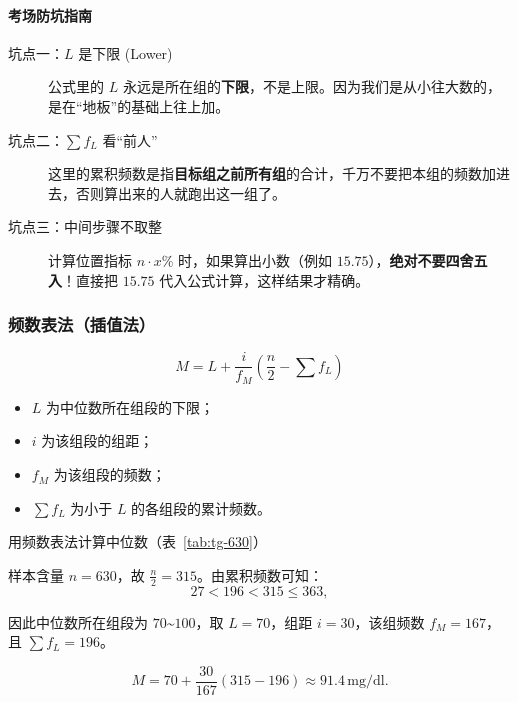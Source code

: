 \documentclass[lang=cn,10pt]{elegantbook}
\begin{document}
\paragraph{考场防坑指南}

\begin{description}
    \item[坑点一：$L$ 是下限 (Lower)]
    公式里的 $L$ 永远是所在组的\textbf{下限}，不是上限。因为我们是从小往大数的，是在“地板”的基础上往上加。

    \item[坑点二：$\sum f_L$ 看“前人”]
    这里的累积频数是指\textbf{目标组之前所有组}的合计，千万不要把本组的频数加进去，否则算出来的人就跑出这一组了。

    \item[坑点三：中间步骤不取整]
    计算位置指标 $n \cdot x\%$ 时，如果算出小数（例如 $15.75$），\textbf{绝对不要四舍五入}！直接把 $15.75$ 代入公式计算，这样结果才精确。
\end{description}

\subsubsection{频数表法（插值法）}
\begin{equation}
M=L+\frac{i}{f_M}\left(\frac{n}{2}-\sum f_L\right)
\end{equation}

\begin{itemize}
\item $L$ 为中位数所在组段的下限；
\item $i$ 为该组段的组距；
\item $f_M$ 为该组段的频数；
\item $\sum f_L$ 为小于 $L$ 的各组段的累计频数。
\end{itemize}

\vspace{0.2cm}

\begin{exercise}
    用频数表法计算中位数（表~\ref{tab:tg-630}）
\end{exercise}

\vspace{0.2cm}

\begin{solution}

样本含量 $n=630$，故 $\frac{n}{2}=315$。由累积频数可知：
\[27<196<315\le 363,\]

因此中位数所在组段为 $70\text{\textasciitilde}100$，取 $L=70$，组距 $i=30$，该组频数 $f_M=167$，且 $\sum f_L=196$。

\[M=70+\frac{30}{167}\left(315-196\right)\approx 91.4\,\mathrm{mg/dl}.\]

\end{solution}
\end{document}
